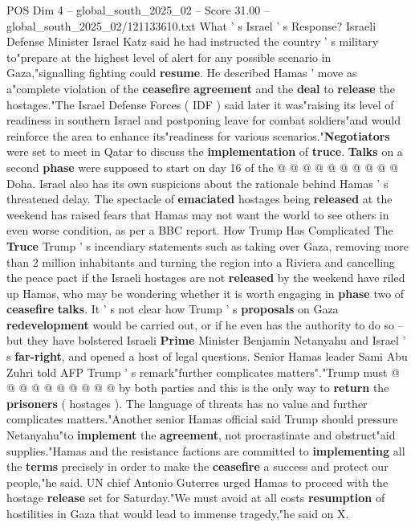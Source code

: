 \begin{textsample}{POS Dim 4 – global\_south\_2025\_02 – Score 31.00 – global\_south\_2025\_02/121133610.txt}
What ' s Israel ' s Response?
Israeli Defense Minister Israel Katz said he had instructed the country ' s military to"prepare at the highest level of alert for any possible scenario in Gaza,"signalling fighting could \textbf{resume}.
He described Hamas ' move as a"complete violation of the \textbf{ceasefire} \textbf{agreement} and the \textbf{deal} to \textbf{release} the hostages."The Israel Defense Forces ( IDF ) said later it was"raising its level of readiness in southern Israel and postponing leave for combat soldiers"and would reinforce the area to enhance its"readiness for various scenarios."\textbf{Negotiators} were set to meet in Qatar to discuss the \textbf{implementation} of \textbf{truce}. \textbf{Talks} on a second \textbf{phase} were supposed to start on day 16 of the @ @ @ @ @ @ @ @ @ @ Doha.
Israel also has its own suspicions about the rationale behind Hamas ' s threatened delay.
The spectacle of \textbf{emaciated} hostages being \textbf{released} at the weekend has raised fears that Hamas may not want the world to see others in even worse condition, as per a BBC report.
How Trump Has Complicated The \textbf{Truce} Trump ' s incendiary statements such as taking over Gaza, removing more than 2 million inhabitants and turning the region into a Riviera and cancelling the peace pact if the Israeli hostages are not \textbf{released} by the weekend have riled up Hamas, who may be wondering whether it is worth engaging in \textbf{phase} two of \textbf{ceasefire} \textbf{talks}.
It ' s not clear how Trump ' s \textbf{proposals} on Gaza \textbf{redevelopment} would be carried out, or if he even has the authority to do so -- but they have bolstered Israeli \textbf{Prime} Minister Benjamin Netanyahu and Israel ' s \textbf{far-right}, and opened a host of legal questions.
Senior Hamas leader Sami Abu Zuhri told AFP Trump ' s remark"further complicates matters"."Trump must @ @ @ @ @ @ @ @ @ @ by both parties and this is the only way to \textbf{return} the \textbf{prisoners} ( hostages ).
The language of threats has no value and further complicates matters."Another senior Hamas official said Trump should pressure Netanyahu"to \textbf{implement} the \textbf{agreement}, not procrastinate and obstruct"aid supplies."Hamas and the resistance factions are committed to \textbf{implementing} all the \textbf{terms} precisely in order to make the \textbf{ceasefire} a success and protect our people,"he said.
UN chief Antonio Guterres urged Hamas to proceed with the hostage \textbf{release} set for Saturday."We must avoid at all costs \textbf{resumption} of hostilities in Gaza that would lead to immense tragedy,"he said on X.

\end{textsample}
